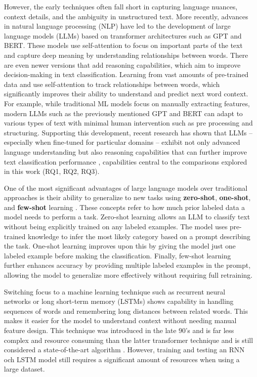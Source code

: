 However, the early techniques often fall short in capturing language nuances, context details, and the ambiguity in unstructured text. More recently, advances in natural language processing (NLP) have led to the development of large language models (LLMs) based on transformer architectures such as GPT and BERT. These models use self-attention to focus on important parts of the text and capture deep meaning by understanding relationships between words. There are even newer versions that add reasoning capabilities, which aim to improve decision-making in text classification. Learning from vast amounts of pre-trained data and use self-attention to track relationships between words, which significantly improves their ability to understand and predict next word context. For example, while traditional ML models focus on manually extracting features, modern LLMs such as the previously mentioned GPT and BERT can adapt to various types of text with minimal human intervention such as pre processing and structuring. Supporting this development, recent research has shown that LLMs -- especially when fine-tuned for particular domains -- exhibit not only advanced language understanding but also reasoning capabilities that can further improve text classification performance \cite{huang2024classification, andersson2024ikea, merritt2022transformer, nazyrova2024medical, wang2024classifiers}, capabilities central to the comparisons explored in this work (RQ1, RQ2, RQ3).

One of the most significant advantages of large language models over traditional approaches is their ability to generalize to new tasks using \textbf{zero-shot}, \textbf{one-shot}, and \textbf{few-shot} learning \cite{brown2020language}. These concepts refer to how much prior labeled data a model needs to perform a task. Zero-shot learning allows an LLM to classify text without being explicitly trained on any labeled examples. The model uses pre-trained knowledge to infer the most likely category based on a prompt describing the task. One-shot learning improves upon this by giving the model just one labeled example before making the classification. Finally, few-shot learning further enhances accuracy by providing multiple labeled examples in the prompt, allowing the model to generalize more effectively without requiring full retraining.

Switching focus to a machine learning technique such as recurrent neural networks or long short-term memory (LSTMs) shows capability in handling sequences of words and remembering long distances between related words. This makes it easier for the model to understand context without needing manual feature design. This technique was introduced in the late 90's and is far less complex and resource consuming than the latter transformer technique and is still considered a state-of-the-art algorithm \cite{wang2024classifiers, hochreiter1997long}. However, training and testing an RNN och LSTM model still requires a significant amount of resources when using a large dataset.

